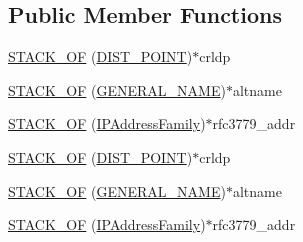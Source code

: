 \subsection*{Public Member Functions}
\begin{DoxyCompactItemize}
\item 
\hyperlink{structx509__st_a2b0bb93ab51f37d05004ca9883a1a3cd}{S\+T\+A\+C\+K\+\_\+\+OF} (\hyperlink{crypto_2ossl__typ_8h_a3f28a968d7df90df4349b76c5c65b612}{D\+I\+S\+T\+\_\+\+P\+O\+I\+NT})$\ast$crldp
\item 
\hyperlink{structx509__st_a07e86f98815ea3f89cc9630a9e35edd7}{S\+T\+A\+C\+K\+\_\+\+OF} (\hyperlink{crypto_2x509v3_2x509v3_8h_a6688fb8a0c7b8e63f3d47bac3a09eb15}{G\+E\+N\+E\+R\+A\+L\+\_\+\+N\+A\+ME})$\ast$altname
\item 
\hyperlink{structx509__st_a3ea1bf1b34132241dadfcb48c4019a4b}{S\+T\+A\+C\+K\+\_\+\+OF} (\hyperlink{crypto_2x509v3_2x509v3_8h_a0a6f68733e253f710d684b599972ac07}{I\+P\+Address\+Family})$\ast$rfc3779\+\_\+addr
\item 
\hyperlink{structx509__st_a2b0bb93ab51f37d05004ca9883a1a3cd}{S\+T\+A\+C\+K\+\_\+\+OF} (\hyperlink{crypto_2ossl__typ_8h_a3f28a968d7df90df4349b76c5c65b612}{D\+I\+S\+T\+\_\+\+P\+O\+I\+NT})$\ast$crldp
\item 
\hyperlink{structx509__st_a07e86f98815ea3f89cc9630a9e35edd7}{S\+T\+A\+C\+K\+\_\+\+OF} (\hyperlink{crypto_2x509v3_2x509v3_8h_a6688fb8a0c7b8e63f3d47bac3a09eb15}{G\+E\+N\+E\+R\+A\+L\+\_\+\+N\+A\+ME})$\ast$altname
\item 
\hyperlink{structx509__st_a3ea1bf1b34132241dadfcb48c4019a4b}{S\+T\+A\+C\+K\+\_\+\+OF} (\hyperlink{crypto_2x509v3_2x509v3_8h_a0a6f68733e253f710d684b599972ac07}{I\+P\+Address\+Family})$\ast$rfc3779\+\_\+addr
\end{DoxyCompactItemize}
